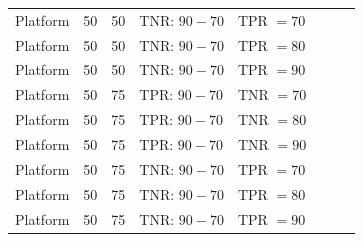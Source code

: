 \begin{longtable}{@{}L{20mm}C{13mm}C{20mm}L{35mm}L{24mm}R{42mm}R{42mm}R{42mm}@{}}
\addlinespace[2pt]
Platform & 50 & 50 & TNR: $90-70$ & TPR $=70$ &  &  &  \\*
Platform & 50 & 50 & TNR: $90-70$ & TPR $=80$ &  &  &  \\*
Platform & 50 & 50 & TNR: $90-70$ & TPR $=90$ &  &  &  \\
\addlinespace[2pt]
Platform & 50 & 75 & TPR: $90-70$ & TNR $=70$ &  &  &  \\*
Platform & 50 & 75 & TPR: $90-70$ & TNR $=80$ &  &  &  \\*
Platform & 50 & 75 & TPR: $90-70$ & TNR $=90$ &  &  &  \\
\addlinespace[2pt]
Platform & 50 & 75 & TNR: $90-70$ & TPR $=70$ &  &  &  \\*
Platform & 50 & 75 & TNR: $90-70$ & TPR $=80$ &  &  &  \\*
Platform & 50 & 75 & TNR: $90-70$ & TPR $=90$ &  &  &  \\
\end{longtable}
\endgroup
